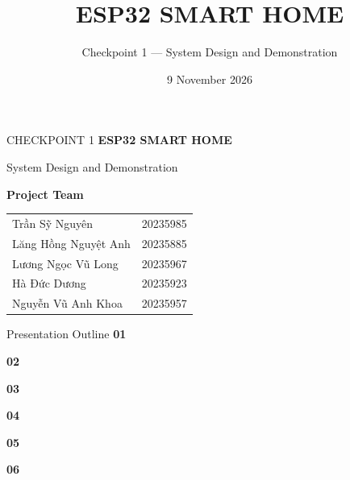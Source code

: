 \documentclass[aspectratio=169,11pt]{beamer}
\title{ESP32 SMART HOME}
\subtitle{Checkpoint 1 --- System Design and Demonstration}
\author{\VNname{Trần Sỹ Nguyên} \and \VNname{Lăng Hồng Nguyệt Anh} \and \VNname{Lương Ngọc Vũ Long} \and \VNname{Hà Đức Dương} \and \VNname{Nguyễn Vũ Anh Khoa}}
\date{9 November 2026}
\renewcommand{\arraystretch}{1.18}
\newcommand{\GroupName}{Project Team}
\newcommand{\VNname}[1]{{\fontencoding{T5}\selectfont #1}}
\begin{document}
\begin{frame}{CHECKPOINT 1}
  \begingroup
  \setlength{\parskip}{0pt}
  \vfill
  {\fontsize{28}{32}\selectfont\color{DeepBlue}\bfseries ESP32 SMART HOME}\par
  \vspace{0.18cm}
  {\large System Design and Demonstration}\par
  \vspace{0.45cm}
  {\normalsize\bfseries \GroupName}\par
  \vspace{0.15cm}
  {\small\renewcommand{\arraystretch}{1.3}
    \begin{tabular}{@{}p{5.1cm}r@{}}
      \VNname{Trần Sỹ Nguyên} & 20235985 \\
      \VNname{Lăng Hồng Nguyệt Anh} & 20235885 \\
      \VNname{Lương Ngọc Vũ Long} & 20235967 \\
      \VNname{Hà Đức Dương} & 20235923 \\
      \VNname{Nguyễn Vũ Anh Khoa} & 20235957 \\
    \end{tabular}\par
  }
  \vspace{0.3cm}
  \vfill
  \endgroup
\end{frame}

\begin{frame}{Presentation Outline}
  \vfill
  {\Large\bfseries\color{AccentRed} 01}\par
  \vspace{0.45cm}
  {\Large\bfseries\color{AccentRed} 02}\par
  \vspace{0.45cm}
  {\Large\bfseries\color{AccentRed} 03}\par
  \vspace{0.45cm}
  {\Large\bfseries\color{AccentRed} 04}\par
  \vspace{0.45cm}
  {\Large\bfseries\color{AccentRed} 05}\par
  \vspace{0.45cm}
  {\Large\bfseries\color{AccentRed} 06}\par
  \vfill
\end{frame}
\end{document}
